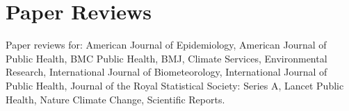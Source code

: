 \section*{Paper Reviews}

\noindent Paper reviews for: American Journal of Epidemiology, American Journal of Public Health, BMC Public Health, BMJ, Climate Services, Environmental Research, International Journal of Biometeorology, International Journal of Public Health, Journal of the Royal Statistical Society: Series A, Lancet Public Health, Nature Climate Change, Scientific Reports.

